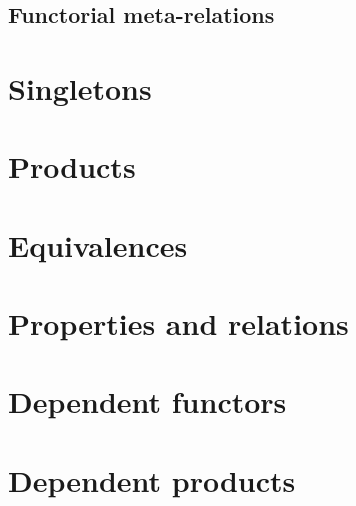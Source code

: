 \documentclass[a4paper]{article}
\theoremstyle{definition}
\theoremstyle{remark}
\begin{document}
\subsection{Functorial meta-relations}

\section{Singletons}
\label{sec:singletons}

\section{Products}
\label{sec:products}

\section{Equivalences}
\label{sec:equivalences}

\section{Properties and relations}
\label{sec:properties}
\label{sec:relations}

\section{Dependent functors}

\section{Dependent products}



\end{document}
